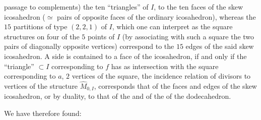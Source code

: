 passage to complements) the ten ``triangles'' of $I$,  to the ten faces of the skew icosahedron ($\simeq$ pairs of opposite faces of the ordinary icosahedron), whereas the $15$ partitions of type $(2,2,1)$ of $I$, which one can interpret as the square structures on four of the $5$ points of $I$
(by associating with such a square the two pairs of diagonally opposite vertices) correspond to the $15$ edges of the said skew icosahedron.
A side  is contained  to a face  of the icosahedron, if and only if the ``triangle'' $\subset I$ corresponding to $f$ has as intersection with the square corresponding to $a$,   $2$  vertices of the square, 
 the incidence relation of divisors to vertices of the structure $\widehat M_{0,I}$, corresponds  that of the faces and edges of the skew icosahedron, or by duality, to that of the  and of the  of the dodecahedron.

We have therefore found:
